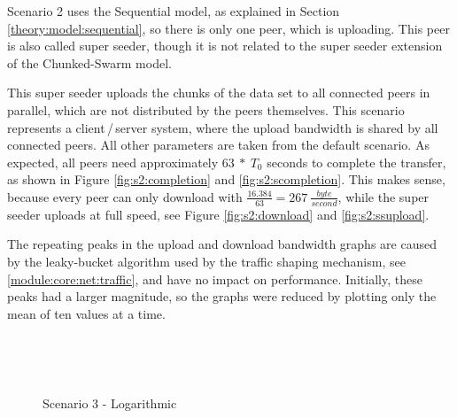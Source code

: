 Scenario 2 uses the Sequential model, as explained in Section \ref{theory:model:sequential}, so there is only one peer, which is uploading. This peer is also called super seeder, though it is not related to the super seeder extension of the Chunked-Swarm model. 

This super seeder uploads the chunks of the data set to all connected peers in parallel, which are not distributed by the peers themselves. This scenario represents a client\,/\,server system, where the upload bandwidth is shared by all connected peers. All other parameters are taken from the default scenario. As expected, all peers need approximately $63\:*\:T_0$ seconds to complete the transfer, as shown in Figure \ref{fig:s2:completion} and \ref{fig:s2:scompletion}. This makes sense, because every peer can only download with $\frac{16.384}{63}=267\:\frac{byte}{second}$, while the super seeder uploads at full speed, see Figure \ref{fig:s2:download} and \ref{fig:s2:ssupload}.

The repeating peaks in the upload and download bandwidth graphs are caused by the leaky-bucket algorithm used by the traffic shaping mechanism, see \ref{module:core:net:traffic}, and have no impact on performance. Initially, these peaks 
had a larger magnitude, so the graphs were reduced by plotting only the mean of ten values at a time.

\vfill


\begin{figure}[!ht]
	\begin{center}	
		~ %

	 	~ %

		\caption{Scenario 3 - Logarithmic}
		\label{fig:s3}
	\end{center}
\end{figure}

